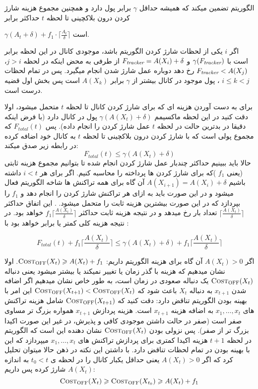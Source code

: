  
الگوریتم 
تضمین میکند که همیشه \on حداقل 
$\gamma$
برابر \off
پول دارد و همچنین مجموع هزینه شارژ کردن درون بلاکچینی \on تا لحظه $t$ حداکثر برابر

$\gamma(A_t + \delta) + f_1 \cdot \lceil \frac{A_t}{\delta} \rceil$
است.

اگر $i$ یکی از لحظات شارژ کردن الگوریتم  باشد، موجودی کانال \on در این لحظه برابر است با
$\gamma(F_{\textit{tracker}})$
و 
$F_{\textit{tracker}} = A(X_i)+\delta$
از طرفی به محض اینکه در لحظه $j > i$،
$F_{\textit{tracker}} < A(X_j)$
رخ دهد دوباره عمل شارژ شدن انجام میگیرد. پس در تمام لحظات 
$i \leq k < j $
، پول موجود در کانال بیشتر از $\gamma$ برابر 
$A(X_k)$
است پس بخش اول قضیه درست است.


برای به دست آوردن هزینه ای که \on برای شارژ کردن کانال تا لحظه $t$ متحمل میشود، اولا دقت کنید در این لحظه \on ماکسیمم 
$\gamma(A(X_t)+\delta)$
پول در کانال دارد (با فرض اینکه دقیقا در بدترین حالت در لحظه $t$ عمل شارژ کردن را انجام داده). پس 
$F_{total}(t)$
که مجموع پولی است که \on با شارژ کردن درون بلاکچینی تا لحظه $t$ به کانال خود اضافه کرده در رابطه زیر صدق میکند:
$$F_{total}(t) \leq \gamma(A(X_t)+\delta)$$
حالا باید ببینیم حداکثر چندبار عمل شارژ کردن انجام شده تا بتوانیم مجموع هزینه ثابتی (یعنی
$f_1$
)که \on برای شارژ کردن ها پرداخته را محاسبه کنیم. 
اگر برای هر
$i<t$
داشته باشیم
$A(X_{i+1}) = A(X_{i}) + \delta $
آن گاه برای همه تراکنش ها شاخه 
الگوریتم 
 فعال میشود و \on در این صورت باید به ازای هر تراکنش شارژ کردن را انجام دهد و
 $f_1$
را بپردازد که در این صورت بیشترین هزینه ثابت را متحمل میشود.
. این اتفاق حداکثر 
$\lceil\frac{A(X_t)}{\delta}\rceil$
تعداد بار رخ میدهد و در نتیجه هزینه ثابت \on حداکثر
$f_1\lceil\frac{A(X_t)}{\delta}\rceil$
خواهد بود. در نتیجه هزینه کلی \on کمتر یا برابر خواهد بود با :

$$F_{total}(t) + f_1\lceil\frac{A(X_t)}{\delta}\rceil \leq \gamma(A(X_t)+\delta) + f_1\lceil\frac{A(X_t)}{\delta}\rceil$$



  اگر 
$A(X_t) > 0$
آن گاه برای هزینه الگوریتم \off
داریم:
$\textsc{Cost}_{\textsc{OFF}}(X_t) \geqslant A(X_t) + f_1$.
 اولا نشان میدهیم که هزینه \off با گذر زمان یا تغییر نمیکند یا بیشتر میشود یعنی دنباله
$\textsc{Cost}_{\textsc{OFF}}(X_t)$
یک دنباله صعودی در زمان است، به طور خاص نشان میدهیم اگر اضافه شدن 
$x_{t+1}$
به دنباله 
$X_t$
باعث شود که
$\textsc{Cost}_{\textsc{OFF}}(X_{t+1}) < \textsc{Cost}_{\textsc{OFF}}(X_{t}) $
این امر با بهینه بودن الگوریتم \off تناقض دارد: دقت کنید که
$\textsc{Cost}_{\textsc{OFF}}(X_{t+1})$
شامل هزینه تراکنش های 
$x_1,\dots,x_t$
به اضافه هزینه 
$x_{t+1}$
است. هزینه  پردازش
$x_{t+1}$
همواره بزرگ تر مساوی صفر است (صفر در حالت داشتن موجودی کافی و پذیرش، در غیر این صورت اکیدا بزرگ تر از صفر).
پس نزولی بودن 
$\textsc{Cost}_{\textsc{OFF}}(X_{t})$
نشان دهنده این است که الگوریتم در لحظه
$t+1$
هزینه اکیدا کمتری برای پردازش تراکنش های 
$x_1,\dots,x_t$
میپردازد که این با بهینه بودن \off در تمام لحظات تناقض دارد. 
با داشتن این نکته در ذهن حالا میتوان تحلیل کرد که اگر 
$A(X_t) > 0$
یعنی \off حداقل یکبار کانال را در لحظه ی
 $t_0 < t$
به اندازه
$A(X_t)$
شارژ کرده پس داریم:
$$\textsc{Cost}_{\textsc{OFF}}(X_t) \geqslant \textsc{Cost}_{\textsc{OFF}}(X_{t_0}) \geqslant A(X_t) + f_1$$





